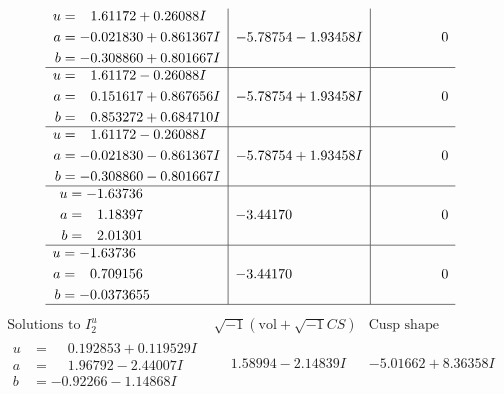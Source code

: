 \documentclass[1p]{elsarticle_modified}
\theoremstyle{definition}
\newcommand{\I}{\sqrt{-1}}
\begin{document}
$$\begin{array}{c|c|c}
\begin{aligned}
u &= \phantom{-}1.61172 + 0.26088 I \\
a &= -0.021830 + 0.861367 I \\
b &= -0.308860 + 0.801667 I\end{aligned}
 & -5.78754 - 1.93458 I & \phantom{-0.000000 } 0 \\ \hline\begin{aligned}
u &= \phantom{-}1.61172 - 0.26088 I \\
a &= \phantom{-}0.151617 + 0.867656 I \\
b &= \phantom{-}0.853272 + 0.684710 I\end{aligned}
 & -5.78754 + 1.93458 I & \phantom{-0.000000 } 0 \\ \hline\begin{aligned}
u &= \phantom{-}1.61172 - 0.26088 I \\
a &= -0.021830 - 0.861367 I \\
b &= -0.308860 - 0.801667 I\end{aligned}
 & -5.78754 + 1.93458 I & \phantom{-0.000000 } 0 \\ \hline\begin{aligned}
u &= -1.63736\phantom{ +0.000000I} \\
a &= \phantom{-}1.18397\phantom{ +0.000000I} \\
b &= \phantom{-}2.01301\phantom{ +0.000000I}\end{aligned}
 & -3.44170\phantom{ +0.000000I} & \phantom{-0.000000 } 0 \\ \hline\begin{aligned}
u &= -1.63736\phantom{ +0.000000I} \\
a &= \phantom{-}0.709156\phantom{ +0.000000I} \\
b &= -0.0373655\phantom{ +0.000000I}\end{aligned}
 & -3.44170\phantom{ +0.000000I} & \phantom{-0.000000 } 0\\
 \hline 
 \end{array}$$\newpage$$\begin{array}{c|c|c}  
\text{Solutions to }I^u_{2}& \I (\text{vol} + \sqrt{-1}CS) & \text{Cusp shape}\\
 \hline 
\begin{aligned}
u &= \phantom{-}0.192853 + 0.119529 I \\
a &= \phantom{-}1.96792 - 2.44007 I \\
b &= -0.92266 - 1.14868 I\end{aligned}
 & \phantom{-}1.58994 - 2.14839 I & -5.01662 + 8.36358 I \\ \hline\begin{aligned}

\end{aligned}
\end{array}$$
\end{document}
